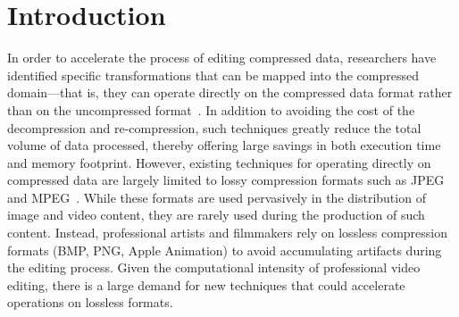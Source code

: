 \section{Introduction}



In order to accelerate the process of editing compressed data,
researchers have identified specific transformations that can be
mapped into the compressed domain---that is, they can operate directly
on the compressed data format rather than on the uncompressed
format~\cite{chang95survey,mandal95survey,smith95survey,wee02survey}.
In addition to avoiding the cost of the decompression and
re-compression, such techniques greatly reduce the total volume of
data processed, thereby offering large savings in both execution time
and memory footprint.  However, existing techniques for operating
directly on compressed data are largely limited to lossy compression
formats such as
JPEG~\cite{dugad01,feng03,mukherjee02,shen96b,shen96,shen98,smith96b}
and MPEG~\cite{smith98,dorai00,nang00,vasudev98,wee02survey}.  While
these formats are used pervasively in the distribution of image and
video content, they are rarely used during the production of such
content.  Instead, professional artists and filmmakers rely on
lossless compression formats (BMP, PNG, Apple Animation) to avoid
accumulating artifacts during the editing process.  Given the
computational intensity of professional video editing, there is a
large demand for new techniques that could accelerate operations on
lossless formats.


